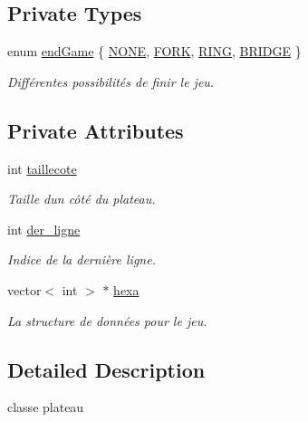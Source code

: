 \subsection*{Private Types}
\begin{DoxyCompactItemize}
\item 
enum \hyperlink{classplateau_a94b54e0a84c850657a83176f812db222}{end\+Game} \{ \hyperlink{classplateau_a94b54e0a84c850657a83176f812db222a5bfc0d833c1c007b5593551af2d9d6cc}{N\+O\+NE}, 
\hyperlink{classplateau_a94b54e0a84c850657a83176f812db222a9b73788ff0e7d0a57da2e75347ae86ad}{F\+O\+RK}, 
\hyperlink{classplateau_a94b54e0a84c850657a83176f812db222a813754211bf907e4b1faa27483995887}{R\+I\+NG}, 
\hyperlink{classplateau_a94b54e0a84c850657a83176f812db222a980eb058ada027f23b4dc56b52f7853f}{B\+R\+I\+D\+GE}
 \}\begin{DoxyCompactList}\small\item\em Différentes possibilités de finir le jeu. \end{DoxyCompactList}
\end{DoxyCompactItemize}
\subsection*{Private Attributes}
\begin{DoxyCompactItemize}
\item 
int \hyperlink{classplateau_a3a22c0369525080629eba2ac2edab03e}{taillecote}
\begin{DoxyCompactList}\small\item\em Taille d\textquotesingle{}un côté du plateau. \end{DoxyCompactList}\item 
int \hyperlink{classplateau_a3ed9526208bf28f0063bdf7c0efb9391}{der\+\_\+ligne}
\begin{DoxyCompactList}\small\item\em Indice de la dernière ligne. \end{DoxyCompactList}\item 
vector$<$ int $>$ $\ast$ \hyperlink{classplateau_a1cf99c526864d850ffe97f5507ab1bcb}{hexa}
\begin{DoxyCompactList}\small\item\em La structure de données pour le jeu. \end{DoxyCompactList}\end{DoxyCompactItemize}


\subsection{Detailed Description}
classe plateau 

